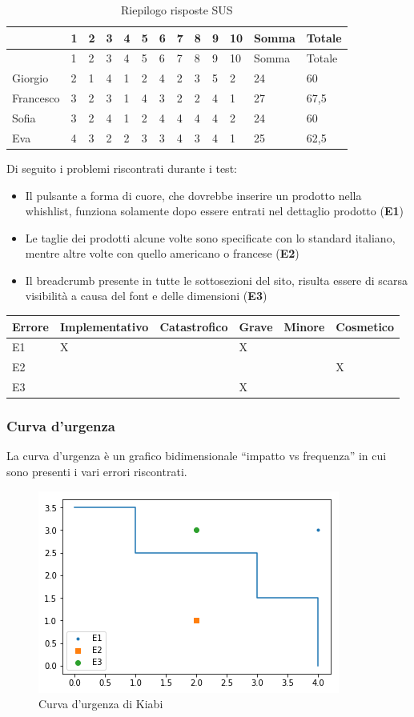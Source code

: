 \documentclass[12pt,italian,]{report}
\begin{document}
\begin{longtable}[]{@{}lllllllllllll@{}}
\caption{Riepilogo risposte SUS}\tabularnewline
\toprule
& 1 & 2 & 3 & 4 & 5 & 6 & 7 & 8 & 9 & 10 & Somma & Totale\tabularnewline
\midrule
\endfirsthead
\toprule
& 1 & 2 & 3 & 4 & 5 & 6 & 7 & 8 & 9 & 10 & Somma & Totale\tabularnewline
\midrule
\endhead
Giorgio & 2 & 1 & 4 & 1 & 2 & 4 & 2 & 3 & 5 & 2 & 24 & 60\tabularnewline
Francesco & 3 & 2 & 3 & 1 & 4 & 3 & 2 & 2 & 4 & 1 & 27 &
67,5\tabularnewline
Sofia & 3 & 2 & 4 & 1 & 2 & 4 & 4 & 4 & 4 & 2 & 24 &
60\tabularnewline
Eva & 4 & 3 & 2 & 2 & 3 & 3 & 4 & 3 & 4 & 1 & 25 &
62,5\tabularnewline
\bottomrule
\end{longtable}

Di seguito i problemi riscontrati durante i test:

\begin{itemize}
\item Il pulsante a forma di cuore, che dovrebbe inserire un prodotto nella whishlist, funziona solamente dopo essere entrati nel dettaglio prodotto (\textbf{E1})
\item Le taglie dei prodotti alcune volte sono specificate con lo standard italiano, mentre altre volte con quello americano o francese (\textbf{E2})
\item Il breadcrumb presente in tutte le sottosezioni del sito, risulta essere di scarsa visibilità a causa del font e delle dimensioni (\textbf{E3})
\end{itemize}

\begin{longtable}[]{@{}llllll@{}}
\toprule
Errore & Implementativo & Catastrofico & Grave & Minore &
Cosmetico\tabularnewline
\midrule
\endhead
E1 & X & & X &\tabularnewline
E2 & & & & & X\tabularnewline
E3 & & & X & &\tabularnewline
\bottomrule
\end{longtable}

\subsubsection{Curva d'urgenza}

La curva d'urgenza è un grafico bidimensionale ``impatto vs frequenza'' in cui sono presenti i vari errori riscontrati.

\begin{figure}[h]
\caption{Curva d'urgenza di Kiabi}
\includegraphics{img/curve_urgenza_kiabi}
\centering
\end{figure}
\end{document}
